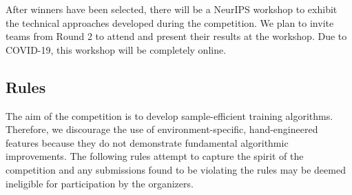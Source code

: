 After winners have been selected, there will be a NeurIPS workshop to exhibit the technical approaches developed during the competition.
We plan to invite teams from Round 2 to attend and present their results at the workshop.
Due to COVID-19, this workshop will be completely online.


\subsection{Rules}
The aim of the competition is to develop sample-efficient training algorithms. Therefore, we discourage the use of
environment-specific, hand-engineered features because they do not demonstrate fundamental algorithmic improvements.
The following rules attempt to capture the spirit of the competition and any submissions found to be violating 
the rules may be deemed ineligible for participation by the organizers.

